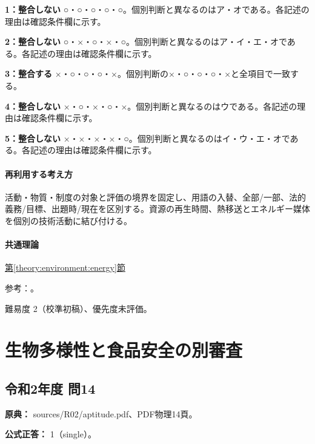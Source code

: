 \noindent\textbf{1：整合しない} ○・○・○・○・○。個別判断と異なるのはア・オである。各記述の理由は確認条件欄に示す。\par

\noindent\textbf{2：整合しない} ○・×・○・×・○。個別判断と異なるのはア・イ・エ・オである。各記述の理由は確認条件欄に示す。\par

\noindent\textbf{3：整合する} ×・○・○・○・×。個別判断の×・○・○・○・×と全項目で一致する。\par

\noindent\textbf{4：整合しない} ×・○・×・○・×。個別判断と異なるのはウである。各記述の理由は確認条件欄に示す。\par

\noindent\textbf{5：整合しない} ×・×・×・×・○。個別判断と異なるのはイ・ウ・エ・オである。各記述の理由は確認条件欄に示す。\par

\paragraph{再利用する考え方} 活動・物質・制度の対象と評価の境界を固定し、用語の入替、全部/一部、法的義務/目標、出題時/現在を区別する。資源の再生時間、熱移送とエネルギー媒体を個別の技術活動に結び付ける。

\paragraph{共通理論} \hyperref[theory:environment:energy]{第\ref*{theory:environment:energy}節}

\par 参考：\cite{env_renewable2022,env_hydrogen2015,env_biomass,env_paris}。

\par 難易度 2（校準初稿）、優先度未評価。

\section{生物多様性と食品安全の別審査}

\subsection{令和2年度 問14}
\label{q:r02-reg-apt-14}

\noindent\textbf{原典：} sources/R02/aptitude.pdf、PDF物理14頁。

\textbf{公式正答：} 1（single）。

